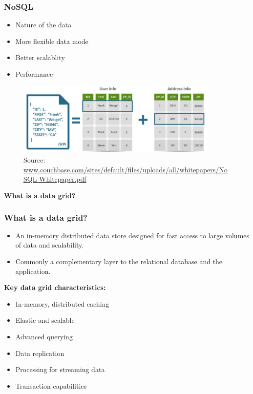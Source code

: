 \documentclass[10pt,utf8]{beamer}
\begin{document}
\begin{frame}
	\frametitle{NoSQL}
	\begin{itemize}
		\item Nature of the data
		\pause
		\item More flexible data mode
		\pause
		\item Better scalablity
		\pause
		\item Performance
	\end{itemize}
	\begin{figure}
		\centering
		\includegraphics[width=10cm]{./img/json_vs_sql.eps}
		\caption{\tiny{Source: \url{www.couchbase.com/sites/default/files/uploads/all/whitepapers/NoSQL-Whitepaper.pdf}}}
	\end{figure}
\end{frame}

\begin{frame}
	\centering
	\huge{\textbf{What is a data grid?}}
\end{frame}

\begin{frame}
	\frametitle{What is a data grid?}
	\begin{itemize}
	 \item An in-memory distributed data store designed for fast access to large volumes of data and scalability.
	 \item Commonly a complementary layer to the relational database and the application.
	\end{itemize}
	\centering
	 {
	\color{blue}\textbf{Key data grid characteristics:}\color{black}
	\begin{itemize}
	 \item In-memory, distributed caching
	 \item Elastic and scalable
	 \item Advanced querying
	 \item Data replication
	 \item Processing for streaming data
	 \item Transaction capabilities
	\end{itemize}
	}
\end{frame}
\end{document}
